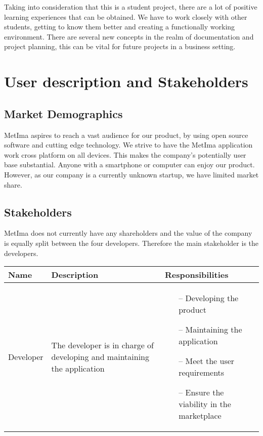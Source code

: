 \documentclass{article}
\begin{document}
Taking into consideration that this is a student project, there are a lot of positive learning experiences that can be obtained. We have to work closely with other students, getting to know them better and creating a functionally working environment. There are several new concepts in the realm of documentation and project planning, this can be vital for future projects in a business setting.

\section{User description and Stakeholders}
\subsection{Market Demographics}
MetIma aspires to reach a vast audience for our product, by using open source software and cutting edge technology. We strive to have the MetIma application work cross platform on all devices. This makes the company's potentially user base substantial. Anyone with a smartphone or computer can enjoy our product. However, as our company is a currently unknown startup, we have limited market share. 
\subsection{Stakeholders}
MetIma does not currently have any shareholders and the value of the company is equally split between the four developers. Therefore the main stakeholder is the developers. \vspace{0.2in} \newline 
\begin{tabularx}{1.0\textwidth} { 
  | >{\raggedright\arraybackslash}X 
  | >{\raggedright\arraybackslash}X
  | >{\raggedright\arraybackslash}X | }
    \hline
    \rowcolor{lightgray} Name & Description & Responsibilities \\
    \hline
    Developer  & The developer is in charge of developing and maintaining the application &
    \begin{itemize}
        \item[--] Developing the product
        \item[--] Maintaining the application 
        \item[--] Meet the user requirements
        \item[--] Ensure the viability in the marketplace
    \end{itemize}{} \\
    \hline
\end{tabularx}
\end{document}
